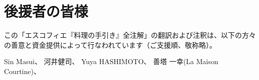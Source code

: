 \hypertarget{benefactors}{%
\section{後援者の皆様}\label{benefactors}}

\thispagestyle{empty}

この「エスコフィエ『料理の手引き』全注解」の翻訳および注釈は、以下の方々の善意と資金提供によって行なわれています（ご支援順、敬称略）。

Sin Masui、\href{20180524-23h,2x,novelsoundsmail@gmail.com}{}
河井健司、\href{20180525-0h14,10x,kwibeng@gmail.com}{} Yuya
HASHIMOTO、\href{20180525-1h40,2x,hashimo0910@gmail.com}{} 善塔 一幸(La
Maison
Courtine)、\href{20180525-8h56,10x,kazuyukizento120@docomo.ne.jp}{}
